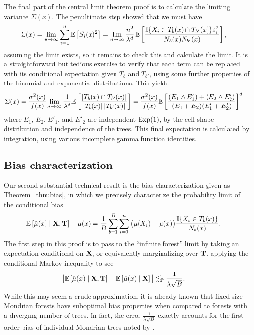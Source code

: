 The final part of the central limit theorem proof is to calculate
the limiting variance $\Sigma(x)$.
The penultimate step showed that we must have
%
\begin{align*}
  \Sigma(x)
  &= \lim_{n \to \infty} \sum_{i=1}^n \mathbb{E} \left[S_i(x)^2 \right]
  = \lim_{n \to \infty}
  \frac{n^2}{\lambda^d} \,
  \mathbb{E} \left[
    \frac{\mathbb{I}\{X_i \in T_b(x) \cap T_{b'}(x)\} \varepsilon_i^2}
    {N_{b}(x) N_{b'}(x)}
  \right],
\end{align*}
%
assuming the limit exists, so it remains to check this and calculate
the limit. It is a straightforward but tedious exercise to verify
that each term can be replaced with its conditional expectation
given $T_b$ and $T_{b'}$, using some further properties of
the binomial and exponential distributions. This yields
%
\begin{align*}
  \Sigma(x)
  &=
  \frac{\sigma^2(x)}{f(x)}
  \lim_{\lambda \to \infty}
  \frac{1}{\lambda^d}
  \mathbb{E} \left[
    \frac{|T_{b}(x) \cap T_{b'}(x)|}
    {|T_{b}(x)| \, |T_{b'}(x)|}
  \right]
  = \frac{\sigma^2(x)}{f(x)}
  \mathbb{E} \left[
    \frac{(E_{1} \wedge E'_{1}) + (E_{2} \wedge E'_{2})}
    {(E_{1} + E_{2}) (E'_{1} + E'_{2})}
  \right]^d
\end{align*}
%
where $E_1$, $E_2$, $E'_1$, and $E'_2$ are independent $\operatorname{Exp}(1)$,
by the cell shape distribution and independence of the trees.
This final expectation is calculated by integration, using
various incomplete gamma function identities.

\subsection*{Bias characterization}

Our second substantial technical result is the bias characterization
given as Theorem~\ref{thm:bias}, in which we precisely
characterize the probability limit of the conditional bias
%
\begin{align*}
  \mathbb{E} \left[ \hat \mu(x) \mid \mathbf{X}, \mathbf{T} \right]
  - \mu(x)
  &=
  \frac{1}{B}
  \sum_{b=1}^B
  \sum_{i=1}^n \big( \mu(X_i) - \mu(x) \big)
  \frac{\mathbb{I}\{X_i \in T_b(x)\}}{N_b(x)}.
\end{align*}
%
The first step in this proof is to pass to the ``infinite forest''
limit by taking an expectation conditional on $\mathbf{X}$, or equivalently
marginalizing over $\mathbf{T}$, applying the conditional Markov inequality
to see
%
\begin{align*}
  \big|
  \mathbb{E} \left[ \hat \mu(x) \mid \mathbf{X}, \mathbf{T} \right]
  - \mathbb{E} \left[ \hat \mu(x) \mid \mathbf{X} \right]
  \big|
  &\lesssim_{\mathbb{P}}
  \frac{1}{\lambda \sqrt B}.
\end{align*}
%
While this may seem a crude approximation, it is already known that
fixed-size Mondrian forests have suboptimal bias properties
when compared to forests with a diverging number of trees.
In fact, the error $\frac{1}{\lambda \sqrt B}$
exactly accounts for the first-order bias of individual Mondrian trees noted by
\citet{mourtada2020minimax}.

